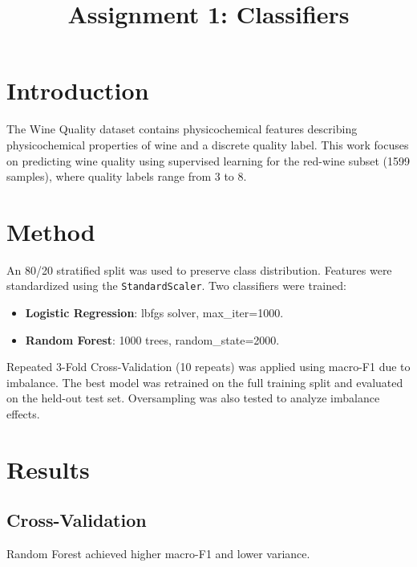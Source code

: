 \documentclass[conference]{IEEEtran}
\begin{document}
\title{Assignment 1: Classifiers}

\author{
}

\maketitle

\section{Introduction}
The Wine Quality dataset contains physicochemical features
describing physicochemical properties of wine and a
discrete quality label. This work focuses on predicting wine quality
using supervised learning for the red-wine subset (1599 samples), where
quality labels range from 3 to 8.

\section{Method}
An 80/20 stratified split was used to preserve class distribution.
Features were standardized using the \texttt{StandardScaler}. Two
classifiers were trained:

\begin{itemize}
    \item \textbf{Logistic Regression}: lbfgs solver, max\_iter=1000.
    \item \textbf{Random Forest}: 1000 trees, random\_state=2000.
\end{itemize}

Repeated 3-Fold Cross-Validation (10 repeats) was applied using
macro-F1 due to imbalance. The best model was retrained on the full
training split and evaluated on the held-out test set. Oversampling was
also tested to analyze imbalance effects.


\section{Results}
\subsection{Cross-Validation}
Random Forest achieved higher macro-F1 and lower variance.
\end{document}
